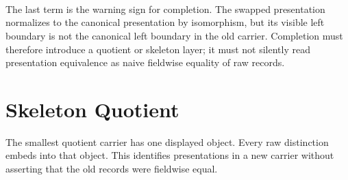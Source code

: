 \documentclass[11pt]{article}
\begin{document}
\begin{code}
\>[0]\AgdaSpace{}%
\AgdaSymbol{=}\AgdaSpace{}%
\AgdaSpace{}%
\<%
\\
%
\\[\AgdaEmptyExtraSkip]%
\>[0]\<%
\\
\>[0]\AgdaSpace{}%
\AgdaSymbol{:}\AgdaSpace{}%
\<%
\\
\>[0]\AgdaSpace{}%
\AgdaSymbol{=}\AgdaSpace{}%
\AgdaSpace{}%
\AgdaSpace{}%
\AgdaSpace{}%
\AgdaSpace{}%
\<%
\\
%
\\[\AgdaEmptyExtraSkip]%
\>[0]\<%
\\
\>[0]\AgdaSpace{}%
\AgdaSymbol{:}\AgdaSpace{}%
\AgdaSpace{}%
\AgdaSpace{}%
\<%
\\
\>[0]\AgdaSpace{}%
\AgdaSymbol{=}\AgdaSpace{}%
\<%
\end{code}

The last term is the warning sign for completion.  The swapped
presentation normalizes to the canonical presentation by isomorphism,
but its visible left boundary is not the canonical left boundary in the
old carrier.  Completion must therefore introduce a quotient or
skeleton layer; it must not silently read presentation equivalence as
naive fieldwise equality of raw records.

\section{Skeleton Quotient}

The smallest quotient carrier has one displayed object.  Every raw
distinction embeds into that object.  This identifies presentations in a
new carrier without asserting that the old records were fieldwise equal.
\end{document}
